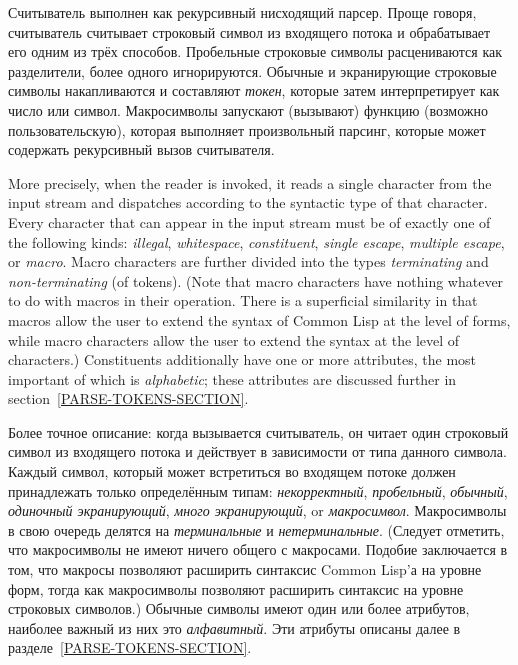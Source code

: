 Считыватель выполнен как рекурсивный нисходящий парсер.  Проще говоря,
считыватель считывает строковый символ из входящего потока и обрабатывает его
одним из трёх способов.  Пробельные строковые символы расцениваются как
разделители, более одного игнорируются. Обычные и экранирующие строковые символы
накапливаются и составляют \emph{токен}, которые затем интерпретирует как число
или символ. Макросимволы запускают (вызывают) функцию (возможно
пользовательскую), которая выполняет произвольный парсинг, которые может
содержать рекурсивный вызов считывателя.

More precisely,
when the reader is invoked, it reads a single character from the input stream
and dispatches according to the syntactic type of that character.
Every character that can appear in the input stream
must be of exactly one of the following kinds:
\emph{illegal},
\emph{whitespace},
\emph{constituent},
\emph{single escape},
\emph{multiple escape}, or
\emph{macro}.
Macro characters are further divided
into the types \emph{terminating} and \emph{non-terminating} (of tokens).
(Note that macro characters have nothing whatever to do with macros
in their operation.  There is a superficial similarity in that macros allow
the user to extend the syntax of Common Lisp at the level of forms,
while macro characters allow the user to extend the syntax at the
level of characters.)
Constituents additionally have one or more attributes,
the most important of which is \emph{alphabetic}; these attributes are discussed
further in section~\ref{PARSE-TOKENS-SECTION}.

Более точное описание: когда вызывается считыватель, он читает один строковый
символ из входящего потока и действует в зависимости от типа данного символа.
Каждый символ, который может встретиться во входящем потоке должен принадлежать
только определённым типам:
\emph{некорректный},
\emph{пробельный},
\emph{обычный},
\emph{одиночный экранирующий},
\emph{много экранирующий}, or
\emph{макросимвол}.
Макросимволы в свою очередь делятся на \emph{терминальные} и
\emph{нетерминальные}. (Следует отметить, что макросимволы не имеют ничего
общего с макросами. Подобие заключается в том, что макросы позволяют расширить
синтаксис Common Lisp'а на уровне форм, тогда как макросимволы позволяют
расширить синтаксис на уровне строковых символов.)
Обычные символы имеют один или более атрибутов, наиболее важный из них это
\emph{алфавитный}. Эти атрибуты описаны далее в разделе~\ref{PARSE-TOKENS-SECTION}.

